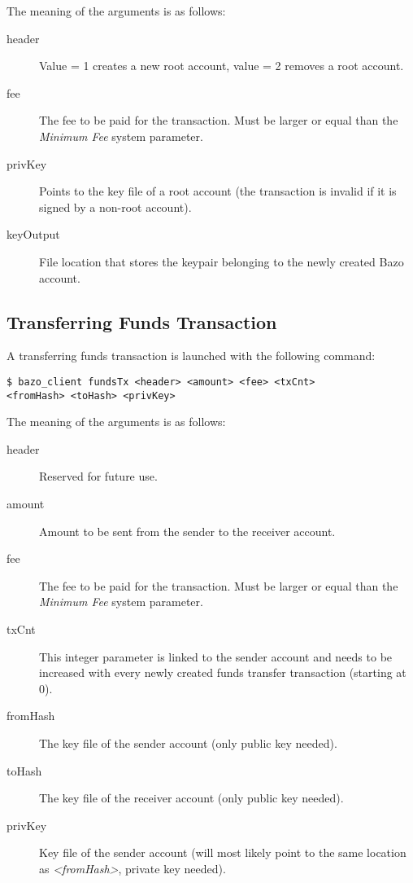 The meaning of the arguments is as follows:

\begin{description}
	\item[header] Value = 1 creates a new root account, value = 2 removes a root account.
	\item[fee] The fee to be paid for the transaction. Must be larger or equal than the \emph{Minimum Fee} system parameter.
	\item[privKey] Points to the key file of a root account (the transaction is invalid if it is signed by a non-root account).
	\item[keyOutput] File location that stores the keypair belonging to the newly created Bazo account.
\end{description}

\subsection{Transferring Funds Transaction}
A transferring funds transaction is launched with the following command:

\begin{lstlisting}
$ bazo_client fundsTx <header> <amount> <fee> <txCnt>
<fromHash> <toHash> <privKey>
\end{lstlisting}

The meaning of the arguments is as follows:

\begin{description}
	\item[header] Reserved for future use.
	\item[amount] Amount to be sent from the sender to the receiver account.
	\item[fee] The fee to be paid for the transaction. Must be larger or equal than the \emph{Minimum Fee} system parameter.
	\item[txCnt] This integer parameter is linked to the sender account and needs to be increased with every newly created funds transfer transaction (starting at 0).
	\item[fromHash] The key file of the sender account (only public key needed).
	\item[toHash] The key file of the receiver account (only public key needed).
	\item[privKey] Key file of the sender account (will most likely point to the same location as \emph{\textless fromHash\textgreater}, private key needed).
\end{description}

